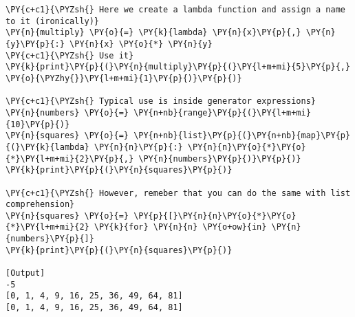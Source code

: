 \begin{Verbatim}[label=\makebox{\url{https://github.com/lucabaldini/cmepda/tree/master/slides/latex/snippets/lambda.py}},commandchars=\\\{\}]
\PY{c+c1}{\PYZsh{} Here we create a lambda function and assign a name to it (ironically)}
\PY{n}{multiply} \PY{o}{=} \PY{k}{lambda} \PY{n}{x}\PY{p}{,} \PY{n}{y}\PY{p}{:} \PY{n}{x} \PY{o}{*} \PY{n}{y}
\PY{c+c1}{\PYZsh{} Use it}
\PY{k}{print}\PY{p}{(}\PY{n}{multiply}\PY{p}{(}\PY{l+m+mi}{5}\PY{p}{,} \PY{o}{\PYZhy{}}\PY{l+m+mi}{1}\PY{p}{)}\PY{p}{)}

\PY{c+c1}{\PYZsh{} Typical use is inside generator expressions}
\PY{n}{numbers} \PY{o}{=} \PY{n+nb}{range}\PY{p}{(}\PY{l+m+mi}{10}\PY{p}{)}
\PY{n}{squares} \PY{o}{=} \PY{n+nb}{list}\PY{p}{(}\PY{n+nb}{map}\PY{p}{(}\PY{k}{lambda} \PY{n}{n}\PY{p}{:} \PY{n}{n}\PY{o}{*}\PY{o}{*}\PY{l+m+mi}{2}\PY{p}{,} \PY{n}{numbers}\PY{p}{)}\PY{p}{)}
\PY{k}{print}\PY{p}{(}\PY{n}{squares}\PY{p}{)}

\PY{c+c1}{\PYZsh{} However, remeber that you can do the same with list comprehension}
\PY{n}{squares} \PY{o}{=} \PY{p}{[}\PY{n}{n}\PY{o}{*}\PY{o}{*}\PY{l+m+mi}{2} \PY{k}{for} \PY{n}{n} \PY{o+ow}{in} \PY{n}{numbers}\PY{p}{]}
\PY{k}{print}\PY{p}{(}\PY{n}{squares}\PY{p}{)}

[Output]
-5
[0, 1, 4, 9, 16, 25, 36, 49, 64, 81]
[0, 1, 4, 9, 16, 25, 36, 49, 64, 81]
\end{Verbatim}